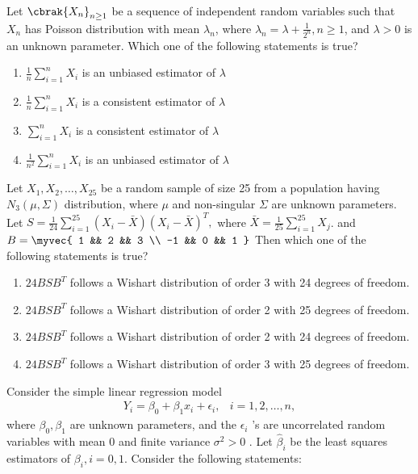 \item Let $\cbrak{X_{n}}_{n \geq 1}$ be a sequence of independent random variables such that $X_{n}$ has Poisson distribution with mean $\lambda_{n}$, where $\lambda_{n} = \lambda + \frac{1}{2^{n}}, n \geq 1 $, and $\lambda > 0$ is an unknown parameter. Which one of the following statements is true?
\begin{enumerate}
    \item $\frac{1}{n} \sum_{i=1}^{n} X_{i}$ is an unbiased estimator of $\lambda$
    \item $\frac{1}{n} \sum_{i=1}^{n} X_{i}$ is a consistent estimator of $\lambda$
    \item $\sum_{i=1}^{n} X_{i}$ is a consistent estimator of $\lambda$
    \item $\frac{1}{n^{2}} \sum_{i=1}^{n} X_{i}$ is an unbiased estimator of $\lambda$
\end{enumerate}

\item Let $X_1, X_2, \dots, X_{25}$  be a random sample of size 25 from a population having $N_3(\mu, \Sigma)$ distribution, where $\mu$ and non-singular $\Sigma$ are unknown parameters. Let $S = \frac{1}{24} \sum_{i=1}^{25} (X_i - \bar{X})(X_i - \bar{X})^T,$
where $\bar{X} = \frac{1}{25} \sum_{i=1}^{25} X_j$. and
$B = \myvec{ 1 && 2 && 3 \\ -1 && 0 && 1 }$ Then which one of the following statements is true?

\begin{enumerate}
    \item $24 BS{B}^{T}$ follows a Wishart distribution of order 3 with 24 degrees of freedom.
    \item $24 BS{B}^{T}$ follows a Wishart distribution of order 2 with 25 degrees of freedom.
    \item $24 BS{B}^{T}$ follows a Wishart distribution of order 2 with 24 degrees of freedom.
    \item $24 BS{B}^{T}$ follows a Wishart distribution of order 3 with 25 degrees of freedom.
\end{enumerate}

 \item Consider the simple linear regression model 
	 \begin{align}
		 Y_i = \beta_0 + \beta_1 x_i + \epsilon_i, & i = 1,2, \dots, n,
	 \end{align}
where $\beta_0, \beta_1$ are unknown parameters, and the $\epsilon_i$ 's are uncorrelated random variables with mean 0 and finite variance $\sigma^2 > 0$ . Let $\hat{\beta}_i$ be the least squares estimators of $\beta_i, i = 0, 1$. Consider the following statements:

